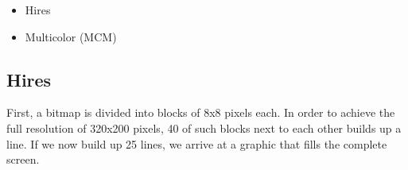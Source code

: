 \begin{itemize}
	\item Hires
	\item Multicolor (MCM)
\end{itemize}


\subsection*{Hires}

First, a bitmap is divided into blocks of 8x8 pixels each. In order to achieve the full resolution of 320x200 pixels, 40 of such blocks next to each other builds up a line. If we now build up 25 lines, we arrive at a graphic that fills the complete screen.

\begin{adjustbox}{width=\textwidth,center}


\end{adjustbox}
